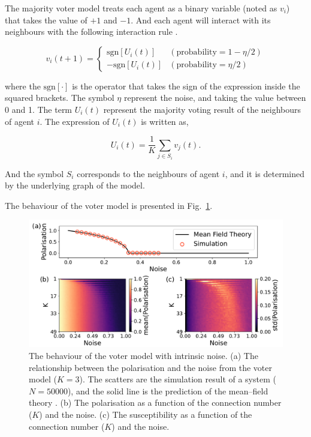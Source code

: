 \documentclass[11pt,twoside]{report}
\begin{document}
The majority voter model
 treats each agent as a binary variable (noted as $v_i$) that takes the value of $+1$ and $-1$. And each agent will interact with its neighbours with the following interaction rule \cite{pimentel2008PRE}. 
 
$$
v_i(t+1) = \left\{ \begin{array}{ll}
\mathrm{sgn} \left[ U_i(t) \right]
& (\textrm{probability} = 1-\eta/2) \\[1em]
-\mathrm{sgn} \left[ U_i(t) \right]
& (\textrm{probability} = \eta/2)
\end{array}
\right.
$$

\noindent where the $\textrm{sgn}[ \cdot ]$ is the operator that takes the sign of the expression inside the squared brackets. The symbol $\eta$ represent the noise, and taking the value between 0 and 1. The term $U_i(t)$ represent the majority voting result of the neighbours of agent $i$. The expression of $U_i(t)$ is written as,

$$
U_i(t) = \frac{1}{K} \sum_{j \in S_i} v_j(t).
$$

\noindent And the symbol $S_i$ corresponds to the neighbours of agent $i$, and it is determined by the underlying graph of the model.
 
The behaviour of the voter model is presented in Fig.\ \ref{fig:voter}.

\begin{figure}
  \includegraphics[width=\linewidth]{majority-voter}
  \caption{The behaviour of the voter model with intrinsic noise. (a) The relationship between the polarisation and the noise from the voter model ($K=3$). The scatters are the simulation result of a system ($N=50000$), and the solid line is the prediction of the mean--field theory \cite{pimentel2008PRE}. (b) The polarisation as a function of the connection number ($K$) and the noise. (c) The susceptibility as a function of the connection number ($K$) and the noise.}
  \label{fig:voter}
\end{figure}
\end{document}
